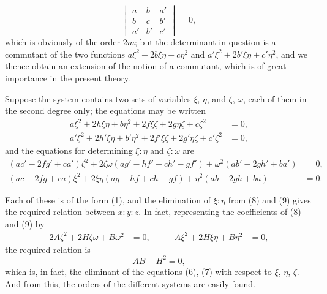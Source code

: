 \documentclass[12pt,a4paper]{article}
\begin{document}
\begin{equation}
\begin{vmatrix}
a & b & a' \\
b & c & b' \\
a' & b' & c'
\end{vmatrix} = 0, \tag{5}
\end{equation}
which is obviously of the order $2m$; but the determinant in question is a commutant of the two functions $a\xi^2 + 2b\xi\eta + c\eta^2$ and $a'\xi^2 + 2b'\xi\eta + c'\eta^2$, and we thence obtain an extension of the notion of a commutant, which is of great importance in the present theory.

Suppose the system contains two sets of variables $\xi$, $\eta$, and $\zeta$, $\omega$, each of them in the second degree only; the equations may be written
\begin{align}
a\xi^2 + 2h\xi\eta + b\eta^2 + 2f\xi\zeta + 2g\eta\zeta + c\zeta^2 &= 0, \tag{6} \\
a'\xi^2 + 2h'\xi\eta + b'\eta^2 + 2f'\xi\zeta + 2g'\eta\zeta + c'\zeta^2 &= 0, \tag{7}
\end{align}
and the equations for determining $\xi : \eta$ and $\zeta : \omega$ are
\begin{align}
(ac' - 2fg' + ca')\zeta^2 + 2\zeta\omega(ag' - hf' + ch' - gf') + \omega^2(ab' - 2gh' + ba') &= 0, \tag{8} \\
(ac - 2fg + ca)\xi^2 + 2\xi\eta(ag - hf + ch - gf) + \eta^2(ab - 2gh + ba) &= 0. \tag{9}
\end{align}

Each of these is of the form (1), and the elimination of $\xi : \eta$ from (8) and (9) gives the required relation between $x : y : z$. In fact, representing the coefficients of (8) and (9) by
\begin{alignat*}{2}
A\zeta^2 + 2H\zeta\omega + B\omega^2 &= 0, \qquad & A\xi^2 + 2H\xi\eta + B\eta^2 &= 0,
\end{alignat*}
the required relation is
\begin{equation}
AB - H^2 = 0, \tag{10}
\end{equation}
which is, in fact, the eliminant of the equations (6), (7) with respect to $\xi$, $\eta$, $\zeta$. And from this, the orders of the different systems are easily found.
\end{document}
